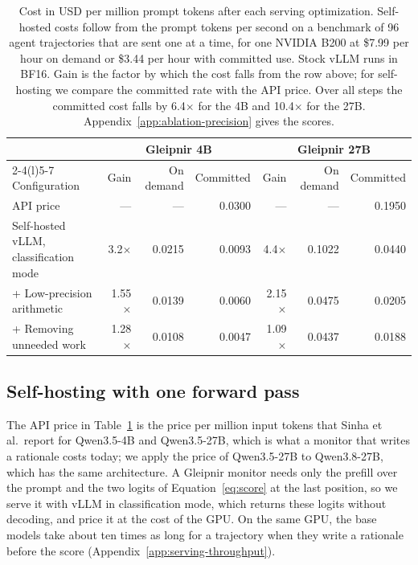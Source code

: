 \begin{table}[t]
\caption{Cost in USD per million prompt tokens after each serving optimization. Self-hosted costs follow from the prompt tokens per second on a benchmark of 96 agent trajectories that are sent one at a time, for one NVIDIA B200 at \$7.99 per hour on demand or \$3.44 per hour with committed use. Stock vLLM runs in BF16. Gain is the factor by which the cost falls from the row above; for self-hosting we compare the committed rate with the API price. Over all steps the committed cost falls by 6.4$\times$ for the 4B and 10.4$\times$ for the 27B. Appendix~\ref{app:ablation-precision} gives the scores.}
\label{tab:serving}
\centering
\small
\setlength{\tabcolsep}{3.5pt}
\begin{tabular}{@{}lrrrrrr@{}}
\toprule
 & \multicolumn{3}{c}{Gleipnir 4B} & \multicolumn{3}{c}{Gleipnir 27B} \\
\cmidrule(lr){2-4}\cmidrule(l){5-7}
Configuration & Gain & On demand & Committed & Gain & On demand & Committed \\
\midrule
API price & --- & --- & 0.0300 & --- & --- & 0.1950 \\
Self-hosted vLLM, classification mode & 3.2$\times$ & 0.0215 & 0.0093 & 4.4$\times$ & 0.1022 & 0.0440 \\
+ Low-precision arithmetic & 1.55$\times$ & 0.0139 & 0.0060 & 2.15$\times$ & 0.0475 & 0.0205 \\
+ Removing unneeded work & 1.28$\times$ & 0.0108 & 0.0047 & 1.09$\times$ & 0.0437 & 0.0188 \\
\bottomrule
\end{tabular}
\end{table}

\subsection{Self-hosting with one forward pass}
\label{sec:serving-selfhost}

The API price in Table~\ref{tab:serving} is the price per million input tokens that Sinha et al.\ report for Qwen3.5-4B and Qwen3.5-27B, which is what a monitor that writes a rationale costs today; we apply the price of Qwen3.5-27B to Qwen3.8-27B, which has the same architecture.
A Gleipnir monitor needs only the prefill over the prompt and the two logits of Equation~\ref{eq:score} at the last position, so we serve it with vLLM in classification mode, which returns these logits without decoding, and price it at the cost of the GPU.
On the same GPU, the base models take about ten times as long for a trajectory when they write a rationale before the score (Appendix~\ref{app:serving-throughput}).

